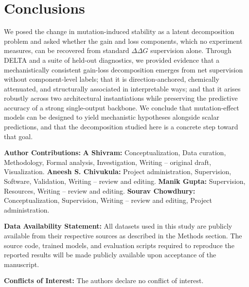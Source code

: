 \documentclass[11pt,a4paper]{article}
\theoremstyle{plain}
\theoremstyle{definition}
\begin{document}
\section{Conclusions}
We posed the change in mutation-induced stability as a latent decomposition problem and asked whether the gain and loss components, which no experiment measures, can be recovered from standard $\Delta\Delta G$ supervision alone. Through DELTA and a suite of held-out diagnostics, we provided evidence that a mechanistically consistent gain-loss decomposition emerges from net supervision without component-level labels; that it is direction-anchored, chemically attenuated, and structurally associated in interpretable ways; and that it arises robustly across two architectural instantiations while preserving the predictive accuracy of a strong single-output backbone. We conclude that mutation-effect models can be designed to yield mechanistic hypotheses alongside scalar predictions, and that the decomposition studied here is a concrete step toward that goal.
\vspace{1.5em}
{
\small
\setlength{\parskip}{0.8em}


\textbf{Author Contributions:}
\textbf{A Shivram:} Conceptualization, Data curation, Methodology, Formal analysis, Investigation, Writing – original draft, Visualization.
\textbf{Aneesh S. Chivukula:} Project administration, Supervision, Software, Validation, Writing – review and editing.
\textbf{Manik Gupta:} Supervision, Resources, Writing – review and editing.
\textbf{Sourav Chowdhury:} Conceptualization, Supervision, Writing – review and editing, Project administration.



\noindent \textbf{Data Availability Statement:} All datasets used in this study are publicly available from their respective sources as described in the Methods section. The source code, trained models, and evaluation scripts required to reproduce the reported results will be made publicly available upon acceptance of the manuscript.


\noindent \textbf{Conflicts of Interest:} The authors declare no conflict of interest.

\par
}




\vspace{2em}
\end{document}

